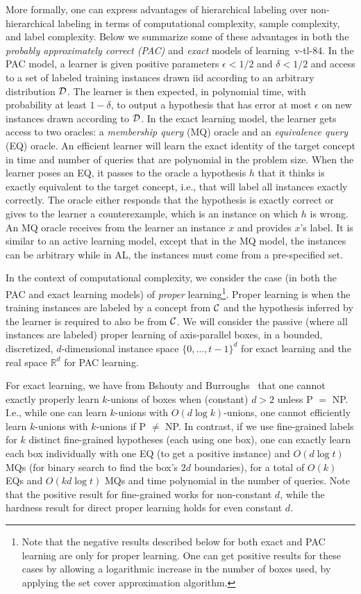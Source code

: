More formally, one can express advantages of hierarchical labeling
over non-hierarchical labeling in terms of computational complexity,
sample complexity, and label complexity.   Below we summarize some
of these advantages in both the {\em probably approximately correct
(PAC)} and {\em exact} models of learning~{v-tl-84}.  In the PAC
model, a learner is given positive parameters $\epsilon < 1/2$ and
$\delta < 1/2$ and access to a set of labeled training instances
drawn iid according to an arbitrary distribution $\cal D$.  The
learner  is then expected, in polynomial time, with probability at
least $1-\delta$, to output a hypothesis  that has error at most
$\epsilon$ on new instances drawn according to $\cal D$.  In the
exact learning model, the learner gets access to two oracles: a
{\em membership query} (MQ) oracle and an {\em equivalence query}
(EQ) oracle.  An efficient learner will learn the exact identity
of the target concept in time and number of queries that are
polynomial in the problem size.  When the learner poses an EQ, it
passes to the oracle a hypothesis $h$ that it thinks is exactly
equivalent to the target concept, i.e., that will label all instances
exactly correctly.  The oracle either responds that the hypothesis
is exactly correct or gives to the learner a counterexample, which
is an instance on which $h$ is wrong.  An MQ oracle receives from
the learner an instance $x$ and provides $x$'s label.  It is similar
to an active learning model, except that in the MQ model, the
instances can be arbitrary while in AL, the instances must come
from a pre-specified set.

In the context  of computational complexity, we consider the case
(in both the PAC and exact learning models) of {\em proper}
learning\footnote{Note that the negative results described below for both
exact and PAC learning are only for proper learning.  One can get
positive results for these cases by allowing a logarithmic increase
in the number of boxes used, by applying the set cover approximation
algorithm.}.
Proper learning is when the training instances are labeled by a
concept from $\cal C$ and the hypothesis inferred by the learner
is required to also be from $\cal C$.
We will consider the passive (where all instances are labeled)
proper learning of axis-parallel boxes,
in a bounded, discretized, $d$-dimensional instance space $\{0,\ldots,t-1\}^d$ for
exact learning and the real space $\mathbb{R}^d$ for PAC learning.

For exact learning, we have from Bshouty and Burroughs~\cite{bb-plapc-03}
that one cannot exactly properly learn $k$-unions of boxes when (constant) $d>2$ unless 
P $=$ NP.  I.e., while one can learn $k$-unions with $O(d \log k)$-unions, one cannot 
efficiently learn $k$-unions with $k$-unions  if P $\ne$ NP.  In contrast, if we
use fine-grained labels for $k$ distinct fine-grained hypotheses (each using one 
box), one can exactly learn each box individually with one EQ (to get a positive
instance) and $O(d \log t)$ MQs (for binary search to find the box's $2d$ boundaries), for a
total of $O(k)$ EQs and $O(kd \log t)$ MQs and time polynomial in the number of queries.
Note that the positive result for fine-grained works for non-constant $d$, while the
hardness result for direct proper learning holds for even constant $d$.

